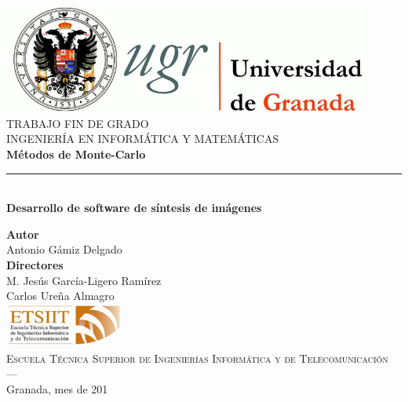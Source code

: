 \begin{titlepage}
 
 
\newlength{\centeroffset}
\setlength{\centeroffset}{-0.5\oddsidemargin}
\addtolength{\centeroffset}{0.5\evensidemargin}
\thispagestyle{empty}

\noindent\hspace*{\centeroffset}\begin{minipage}{\textwidth}

\centering
\includegraphics[width=0.9\textwidth]{img/logo_ugr.jpg}\\[1.4cm]

\textsc{ \Large TRABAJO FIN DE GRADO\\[0.2cm]}
\textsc{ INGENIERÍA EN INFORMÁTICA Y MATEMÁTICAS}\\[1cm]
% 
{\Huge\bfseries Métodos de Monte-Carlo\\
}
\noindent\rule[-1ex]{\textwidth}{3pt}\\[3.5ex]
{\large\bfseries Desarrollo de software de síntesis de imágenes }
\end{minipage}

\vspace{2.5cm}
\noindent\hspace*{\centeroffset}\begin{minipage}{\textwidth}
\centering

\textbf{Autor}\\ {Antonio Gámiz Delgado}\\[2.5ex]
\textbf{Directores}\\
{M. Jesús García-Ligero Ramírez\\
Carlos Ureña Almagro}\\[2cm]
\includegraphics[width=0.3\textwidth]{img/etsiit_logo.png}\\[0.1cm]
\textsc{Escuela Técnica Superior de Ingenierías Informática y de Telecomunicación}\\
\textsc{---}\\
Granada, mes de 201
\end{minipage}
\end{titlepage}


